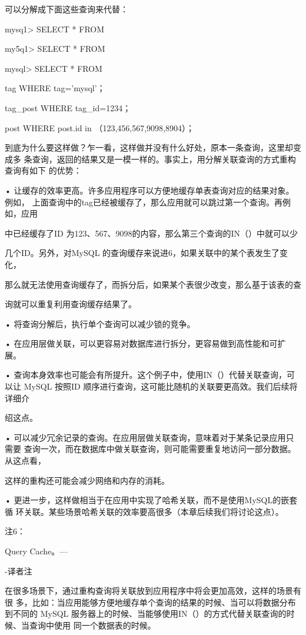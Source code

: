 可以分解成下面这些查询来代替：

mysq1> SELECT * FROM

my5q1> SELECT * FROM

mysql> SELECT * FROM

tag WHERE tag='mysql'；

tag\_post WHERE tag\_id=1234；

post WHERE post.id in （123,456,567,9098,8904）；

到底为什么要这样做？乍一看，这样做并没有什么好处，原本一条查询，这里却变成多
条查询，返回的结果又是一模一样的。事实上，用分解关联查询的方式重构查询有如下
的优势：

• 让缓存的效率更高。许多应用程序可以方便地缓存单表查询对应的结果对象。例如，
上面查询中的tag已经被缓存了，那么应用就可以跳过第一个查询。再例如，应用

中已经缓存了ID 为123、567、9098的内容，那么第三个查询的IN（）中就可以少

几个ID。另外，对MySQL 的查询缓存来说进6，如果关联中的某个表发生了变化，

那么就无法使用查询缓存了，而拆分后，如果某个表很少改变，那么基于该表的查

询就可以重复利用查询缓存结果了。

• 将查询分解后，执行单个查询可以减少锁的竞争。

• 在应用层做关联，可以更容易对数据库进行拆分，更容易做到高性能和可扩展。

• 查询本身效率也可能会有所提升。这个例子中，使用IN（）代替关联查询，可以让
MySQL 按照ID 顺序进行查询，这可能比随机的关联要更高效。我们后续将详细介

绍这点。

• 可以减少冗余记录的查询。在应用层做关联查询，意味着对于某条记录应用只需要
查询一次，而在数据库中做关联查询，则可能需要重复地访问一部分数据。从这点看，

这样的重构还可能会减少网络和内存的消耗。

• 更进一步，这样做相当于在应用中实现了哈希关联，而不是使用MySQL的嵌套循
环关联。某些场景哈希关联的效率要高很多（本章后续我们将讨论这点）。

注6：

Query Cache。—

-译者注

在很多场景下，通过重构查询将关联放到应用程序中将会更加高效，这样的场景有很
多，比如：当应用能够方便地缓存单个查询的结果的时候、当可以将数据分布到不同的
MySQL 服务器上的时候、当能够使用IN（）的方式代替关联查询的时候、当查询中使用
同一个数据表的时候。

